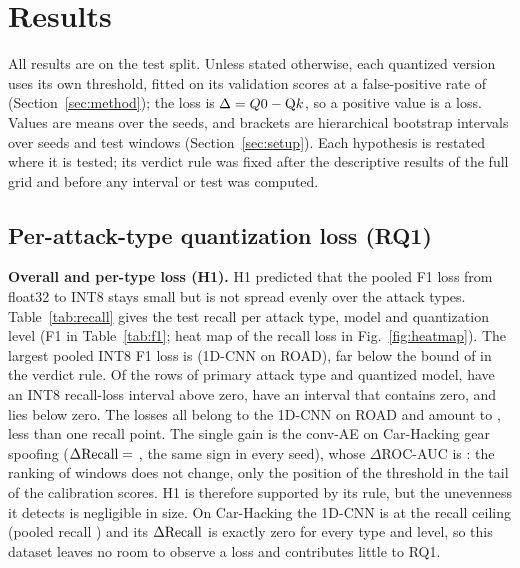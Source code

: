 \section{Results}\label{sec:results}

All results are on the test split. Unless stated otherwise, each quantized version uses its own threshold, fitted on
its validation scores at a false-positive rate of \TargetFPR{} (Section~\ref{sec:method}); the loss is
$\Delta = Q0{} - \mathrm{Q}k$, so a positive value is a loss. Values are means over the \NSeeds{} seeds, and brackets
are \CIPct{} hierarchical bootstrap intervals over seeds and test windows (Section~\ref{sec:setup}). Each hypothesis is
restated where it is tested; its verdict rule was fixed after the descriptive results of the full grid and before
any interval or test was computed.



\subsection{Per-attack-type quantization loss (RQ1)}\label{sec:res-rq1}

\textbf{Overall and per-type loss (H1).} H1 predicted that the pooled F1 loss from float32 to INT8 stays small but is
not spread evenly over the attack types. Table~\ref{tab:recall} gives the test recall per attack type, model and
quantization level (F1 in Table~\ref{tab:f1}; heat map of the recall loss in Fig.~\ref{fig:heatmap}). The largest
pooled INT8 F1 loss is \PooledDFOneMax{} (1D-CNN on ROAD), far below the bound of \HOneMax{} in the verdict rule. Of the
\NTypeRows{} rows of primary attack type and quantized model, \NLossRows{} have an INT8 recall-loss interval above
zero, \NZeroRows{} have an interval that contains zero, and \NGainRows{} lies below zero. The \NLossRows{} losses
all belong to the 1D-CNN on ROAD and amount to \LossRowsRange, less than one recall point. The single gain is the
conv-AE on Car-Hacking gear spoofing ($\Delta\mathrm{Recall}{} =$ \GearGainCI, the same sign in every seed), whose $\Delta$ROC-AUC is
\GearGainAUC: the ranking of windows does not change, only the position of the threshold in the tail of the
calibration scores. H1 is therefore supported by its rule, but the unevenness it detects is negligible in size. On
Car-Hacking the 1D-CNN is at the recall ceiling (pooled recall \CHCNNRecall) and its $\Delta\mathrm{Recall}$ is exactly zero for
every type and level, so this dataset leaves no room to observe a loss and contributes little to RQ1.

